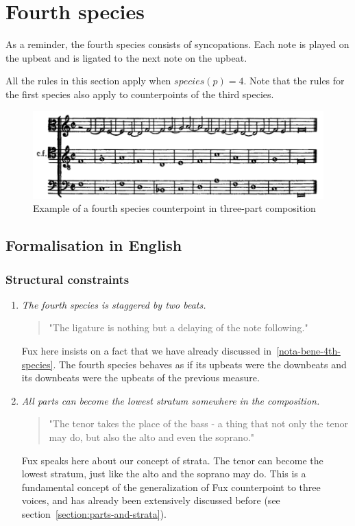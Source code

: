 \section{Fourth species}
As a reminder, the fourth species consists of syncopations. Each note is played on the upbeat and is ligated to the next note on the upbeat.

All the rules in this section apply when $species(p) =4$. Note that the rules for the first species also apply to counterpoints of the third species.

\begin{figure}[h]
    \centering
    \includegraphics[width=1\textwidth]{Images/Species_examples/4sp-example.png}
    \caption{Example of a fourth species counterpoint in three-part composition}
    \label{fig:example-4sp}
\end{figure}

\subsection{Formalisation in English}\label{formalisation-en-4th}
\subsubsection{Structural constraints}
\begin{enumerate}[wide, label=\bfseries 4.S\arabic*]
\setcounter{enumi}{0}
    \item \textit{The fourth species is staggered by two beats.} \label{rule:delaying}    
    \begin{quotation}
        "The ligature is nothing but a delaying of the note following."
        \textcite[p.95]{GaPEng}
    \end{quotation}
    Fux here insists on a fact that we have already discussed in~\ref{nota-bene-4th-species}. The fourth species behaves as if its upbeats were the downbeats and its downbeats were the upbeats of the previous measure.

    \item \textit{All parts can become the lowest stratum somewhere in the composition.} \label{rule:tenor-might-take-place-of-bass}    
    \begin{quotation}
        "The tenor takes the place of the bass - a thing that not only the tenor may do, but also the alto and even the soprano."
        \textcite[p.100]{GaPEng}
    \end{quotation}
    Fux speaks here about our concept of strata. The tenor can become the lowest stratum, just like the alto and the soprano may do. This is a fundamental concept of the generalization of Fux counterpoint to three voices, and has already been extensively discussed before (see section~\ref{section:parts-and-strata}).
\end{enumerate}

